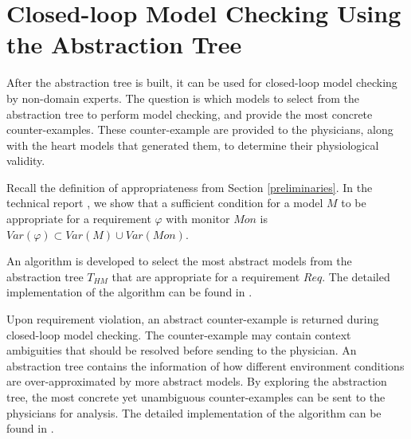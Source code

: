 \section{Closed-loop Model Checking Using the Abstraction Tree}
After the abstraction tree is built, it can be used for closed-loop model checking by non-domain experts. 
The question is which models to select from the abstraction tree to perform model checking, and provide the most concrete counter-examples.
These counter-example are provided to the physicians, along with the heart models that generated them, to determine their physiological validity.

Recall the definition of appropriateness from Section \ref{preliminaries}.
In the technical report \cite{regar_tech}, we show that a sufficient condition for a model $M$ to be appropriate for a requirement $\varphi$ with monitor $Mon$ is
$Var(\varphi) \subset Var(M) \cup Var(Mon)$.

An algorithm is developed to select the most abstract models from the abstraction tree $T_{HM}$ that are appropriate for a requirement $Req$. The detailed implementation of the algorithm can be found in \cite{regar_tech}.

Upon requirement violation, an abstract counter-example is returned during closed-loop model checking. The counter-example may contain context ambiguities that should be resolved before sending to the physician. An abstraction tree contains the information of how different environment conditions are over-approximated by more abstract models. By exploring the abstraction tree, the most concrete yet unambiguous counter-examples can be sent to the physicians for analysis. The detailed implementation of the algorithm can be found in \cite{regar_tech}.%




